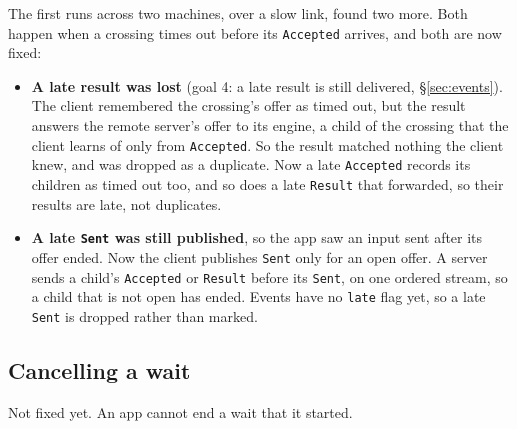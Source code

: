 \documentclass[11pt]{article}
\newcommand{\code}[1]{\texttt{#1}}
\begin{document}
The first runs across two machines, over a slow link, found two more. Both
happen when a crossing times out before its \code{Accepted} arrives, and both
are now fixed:
\begin{itemize}[nosep]
  \item \textbf{A late result was lost} (goal 4: a late result is still
        delivered, \S\ref{sec:events}). The client remembered the crossing's
        offer as timed out, but the result answers the remote server's offer
        to its engine, a child of the crossing that the client learns of only
        from \code{Accepted}. So the result matched nothing the client knew,
        and was dropped as a duplicate. Now a late \code{Accepted} records its
        children as timed out too, and so does a late \code{Result} that
        forwarded, so their results are late, not duplicates.
  \item \textbf{A late \code{Sent} was still published}, so the app saw an
        input sent after its offer ended. Now the client publishes
        \code{Sent} only for an open offer. A server sends a child's
        \code{Accepted} or \code{Result} before its \code{Sent}, on one
        ordered stream, so a child that is not open has ended. Events have no
        \code{late} flag yet, so a late \code{Sent} is dropped rather than
        marked.
\end{itemize}

\subsection{Cancelling a wait}
\label{sec:wake}

Not fixed yet. An app cannot end a wait that it started.
\end{document}
